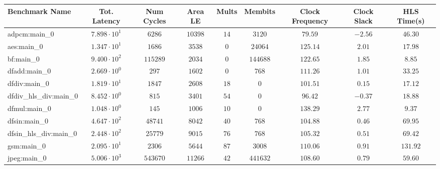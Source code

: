 \begin{tabular}{|l|c|c|c|c|c|c|c|c|}
\hline
Benchmark Name          & Tot. Latency           & Num Cycles & Area LE   & Mults   & Membits    & Clock Frequency & Clock Slack & HLS Time(s) \\
\hline
adpcm:main\_0           & $ 7.898 \cdot 10^{1} $ & $ 6286   $ & $ 10398 $ & $ 14  $ & $ 3120   $ & $ 79.59       $ & $ -2.56   $ & $ 46.30   $ \\
aes:main\_0             & $ 1.347 \cdot 10^{1} $ & $ 1686   $ & $ 3538  $ & $ 0   $ & $ 24064  $ & $ 125.14      $ & $ 2.01    $ & $ 17.98   $ \\
bf:main\_0              & $ 9.400 \cdot 10^{2} $ & $ 115289 $ & $ 2034  $ & $ 0   $ & $ 144688 $ & $ 122.65      $ & $ 1.85    $ & $ 8.85    $ \\
dfadd:main\_0           & $ 2.669 \cdot 10^{0} $ & $ 297    $ & $ 1602  $ & $ 0   $ & $ 768    $ & $ 111.26      $ & $ 1.01    $ & $ 33.25   $ \\
dfdiv:main\_0           & $ 1.819 \cdot 10^{1} $ & $ 1847   $ & $ 2608  $ & $ 18  $ & $ 0      $ & $ 101.51      $ & $ 0.15    $ & $ 17.12   $ \\
dfdiv\_hls\_div:main\_0 & $ 8.452 \cdot 10^{0} $ & $ 815    $ & $ 3401  $ & $ 54  $ & $ 0      $ & $ 96.42       $ & $ -0.37   $ & $ 18.88   $ \\
dfmul:main\_0           & $ 1.048 \cdot 10^{0} $ & $ 145    $ & $ 1006  $ & $ 10  $ & $ 0      $ & $ 138.29      $ & $ 2.77    $ & $ 9.37    $ \\
dfsin:main\_0           & $ 4.647 \cdot 10^{2} $ & $ 48741  $ & $ 8042  $ & $ 40  $ & $ 768    $ & $ 104.88      $ & $ 0.46    $ & $ 69.95   $ \\
dfsin\_hls\_div:main\_0 & $ 2.448 \cdot 10^{2} $ & $ 25779  $ & $ 9015  $ & $ 76  $ & $ 768    $ & $ 105.32      $ & $ 0.51    $ & $ 69.42   $ \\
gsm:main\_0             & $ 2.095 \cdot 10^{1} $ & $ 2306   $ & $ 5644  $ & $ 87  $ & $ 3008   $ & $ 110.06      $ & $ 0.91    $ & $ 131.92  $ \\
jpeg:main\_0            & $ 5.006 \cdot 10^{3} $ & $ 543670 $ & $ 11266 $ & $ 42  $ & $ 441632 $ & $ 108.60      $ & $ 0.79    $ & $ 59.60   $ \\

\end{tabular}

